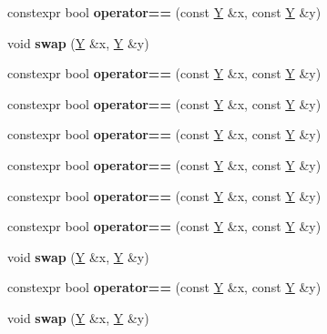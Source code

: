 \begin{DoxyCompactItemize}
\item 
\mbox{\label{struct_y_ac7e15ef8122a599998d833fb4113569c}} 
constexpr bool {\bfseries operator==} (const \mbox{\hyperlink{struct_y}{Y}} \&x, const \mbox{\hyperlink{struct_y}{Y}} \&y)
\item 
\mbox{\label{struct_y_aa7f2267207d139b66d5838048c82f021}} 
void {\bfseries swap} (\mbox{\hyperlink{struct_y}{Y}} \&x, \mbox{\hyperlink{struct_y}{Y}} \&y)
\item 
\mbox{\label{struct_y_ac7e15ef8122a599998d833fb4113569c}} 
constexpr bool {\bfseries operator==} (const \mbox{\hyperlink{struct_y}{Y}} \&x, const \mbox{\hyperlink{struct_y}{Y}} \&y)
\item 
\mbox{\label{struct_y_ac7e15ef8122a599998d833fb4113569c}} 
constexpr bool {\bfseries operator==} (const \mbox{\hyperlink{struct_y}{Y}} \&x, const \mbox{\hyperlink{struct_y}{Y}} \&y)
\item 
\mbox{\label{struct_y_ac7e15ef8122a599998d833fb4113569c}} 
constexpr bool {\bfseries operator==} (const \mbox{\hyperlink{struct_y}{Y}} \&x, const \mbox{\hyperlink{struct_y}{Y}} \&y)
\item 
\mbox{\label{struct_y_ac7e15ef8122a599998d833fb4113569c}} 
constexpr bool {\bfseries operator==} (const \mbox{\hyperlink{struct_y}{Y}} \&x, const \mbox{\hyperlink{struct_y}{Y}} \&y)
\item 
\mbox{\label{struct_y_ac7e15ef8122a599998d833fb4113569c}} 
constexpr bool {\bfseries operator==} (const \mbox{\hyperlink{struct_y}{Y}} \&x, const \mbox{\hyperlink{struct_y}{Y}} \&y)
\item 
\mbox{\label{struct_y_ac7e15ef8122a599998d833fb4113569c}} 
constexpr bool {\bfseries operator==} (const \mbox{\hyperlink{struct_y}{Y}} \&x, const \mbox{\hyperlink{struct_y}{Y}} \&y)
\item 
\mbox{\label{struct_y_aa7f2267207d139b66d5838048c82f021}} 
void {\bfseries swap} (\mbox{\hyperlink{struct_y}{Y}} \&x, \mbox{\hyperlink{struct_y}{Y}} \&y)
\item 
\mbox{\label{struct_y_ac7e15ef8122a599998d833fb4113569c}} 
constexpr bool {\bfseries operator==} (const \mbox{\hyperlink{struct_y}{Y}} \&x, const \mbox{\hyperlink{struct_y}{Y}} \&y)
\item 
\mbox{\label{struct_y_aa7f2267207d139b66d5838048c82f021}} 
void {\bfseries swap} (\mbox{\hyperlink{struct_y}{Y}} \&x, \mbox{\hyperlink{struct_y}{Y}} \&y)
\end{DoxyCompactItemize}


